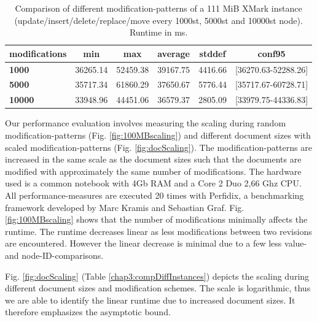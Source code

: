 \begin{table}[tb]
\centering 
\begin{tabular}[r]{|l|c|c|c|c|c|} 
\hline
\textbf{modifications} & \textbf{min} & \textbf{max} & \textbf{average} & \textbf{stddef} & \textbf{conf95}\\
\hline
\hline
\textbf{1000} & 36265.14 & 52459.38 & 39167.75 & 4416.66 & [36270.63-52288.26]\\
\hline
\textbf{5000} & 35717.34 & 61860.29 & 37650.67 & 5776.44 & [35717.67-60728.71]\\
\hline
\textbf{10000} & 33948.96 & 44451.06 & 36579.37 & 2805.09 & [33979.75-44336.83]\\
\hline
\end{tabular}
\label{chap3:comparison}
\vspace{0.5em} 
\caption{Comparison of different modification-patterns of a 111 MiB XMark instance (update/insert/delete/replace/move every 1000st, 5000st and 10000st node). Runtime in ms.}
\end{table}

Our performance evaluation involves measuring the scaling during random modification-patterns (Fig. \ref{fig:100MBscaling}) and different document sizes with scaled modi\-fication-patterns (Fig. \ref{fig:docScaling}). The modification-patterns are increased in the same scale as the document sizes such that the documents are modified with approximately the same number of modifications. The hardware used is a common notebook with 4Gb RAM and a Core 2 Duo 2,66 Ghz CPU. All performance-measures are executed 20 times with Perfidix\cite{kramis2007perfidix}, a benchmarking framework developed by Marc Kramis and Sebastian Graf. Fig. \ref{fig:100MBscaling} shows that the number of modifications minimally affects the runtime. The runtime decreases linear as less modifications between two revisions are encountered. However the linear decrease is minimal due to a few less value- and node-ID-comparisons.

Fig. \ref{fig:docScaling} (Table \ref{chap3:compDiffInstances}) depicts the scaling during different document sizes and modification schemes. The scale is logarithmic, thus we are able to identify the linear runtime due to increased document sizes. It therefore emphasizes the asymptotic bound.


